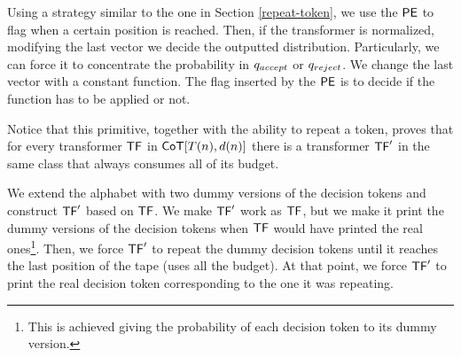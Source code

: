 Using a strategy similar to the one in Section \ref{repeat-token}, we use the $\mathsf{PE}$ to flag when a certain position is reached.
Then, if the transformer is normalized, modifying the last vector we decide the outputted distribution.
Particularly, we can force it to concentrate the probability in $q_{accept}$ or $q_{reject}$.
We change the last vector with a constant function.
The flag inserted by the $\mathsf{PE}$ is to decide if the function has to be applied or not.

\medskip

Notice that this primitive, together with the ability to repeat a token, proves that for every transformer $\mathsf{TF}$ in $\mathsf{CoT}[T(n), d(n)]$ there is a transformer $\mathsf{TF}'$ in the same class that always consumes all of its budget.

We extend the alphabet with two dummy versions of the decision tokens and construct $\mathsf{TF}'$ based on $\mathsf{TF}$.
We make $\mathsf{TF}'$ work as $\mathsf{TF}$, but we make it print the dummy versions of the decision tokens when $\mathsf{TF}$ would have printed the real ones\footnote{This is achieved giving the probability of each decision token to its dummy version.}.
Then, we force $\mathsf{TF}'$ to repeat the dummy decision tokens until it reaches the last position of the tape (uses all the budget).
At that point, we force $\mathsf{TF}'$ to print the real decision token corresponding to the one it was repeating.